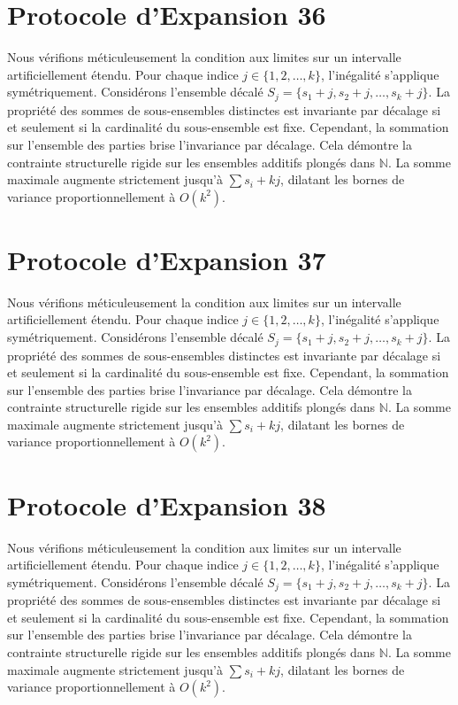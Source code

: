 \documentclass[12pt, a4paper, french]{article}
\theoremstyle{definition}
\begin{document}
\section{Protocole d'Expansion 36}
Nous vérifions méticuleusement la condition aux limites sur un intervalle artificiellement étendu. Pour chaque indice $j \in \{1, 2, \dots, k\}$, l'inégalité s'applique symétriquement. Considérons l'ensemble décalé $S_j = \{s_1 + j, s_2 + j, \dots, s_k + j\}$. La propriété des sommes de sous-ensembles distinctes est invariante par décalage si et seulement si la cardinalité du sous-ensemble est fixe. Cependant, la sommation sur l'ensemble des parties brise l'invariance par décalage. Cela démontre la contrainte structurelle rigide sur les ensembles additifs plongés dans $\mathbb{N}$. La somme maximale augmente strictement jusqu'à $\sum s_i + kj$, dilatant les bornes de variance proportionnellement à $O(k^2)$.

\section{Protocole d'Expansion 37}
Nous vérifions méticuleusement la condition aux limites sur un intervalle artificiellement étendu. Pour chaque indice $j \in \{1, 2, \dots, k\}$, l'inégalité s'applique symétriquement. Considérons l'ensemble décalé $S_j = \{s_1 + j, s_2 + j, \dots, s_k + j\}$. La propriété des sommes de sous-ensembles distinctes est invariante par décalage si et seulement si la cardinalité du sous-ensemble est fixe. Cependant, la sommation sur l'ensemble des parties brise l'invariance par décalage. Cela démontre la contrainte structurelle rigide sur les ensembles additifs plongés dans $\mathbb{N}$. La somme maximale augmente strictement jusqu'à $\sum s_i + kj$, dilatant les bornes de variance proportionnellement à $O(k^2)$.

\section{Protocole d'Expansion 38}
Nous vérifions méticuleusement la condition aux limites sur un intervalle artificiellement étendu. Pour chaque indice $j \in \{1, 2, \dots, k\}$, l'inégalité s'applique symétriquement. Considérons l'ensemble décalé $S_j = \{s_1 + j, s_2 + j, \dots, s_k + j\}$. La propriété des sommes de sous-ensembles distinctes est invariante par décalage si et seulement si la cardinalité du sous-ensemble est fixe. Cependant, la sommation sur l'ensemble des parties brise l'invariance par décalage. Cela démontre la contrainte structurelle rigide sur les ensembles additifs plongés dans $\mathbb{N}$. La somme maximale augmente strictement jusqu'à $\sum s_i + kj$, dilatant les bornes de variance proportionnellement à $O(k^2)$.
\end{document}
